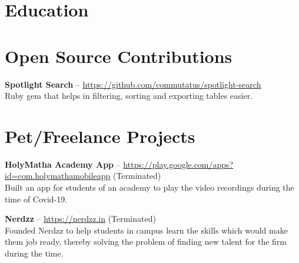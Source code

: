 \documentclass[11pt,a4paper]{moderncv}
\begin{document}


\vspace{10pt}
\section{Education}





\vspace{10pt}
\section{Open Source Contributions}

\cvlistitem
{\textbf{Spotlight Search} -- {\small \href{https://github.com/commutatus/spotlight-search}{https://github.com/commutatus/spotlight-search}}
  \\Ruby gem that helps in filtering, sorting and exporting tables easier.
}




\vspace{10pt}
\section{Pet/Freelance Projects}

\cvlistitem
{\textbf{HolyMatha Academy App} -- {\small \href{https://play.google.com/store/apps/details?id=com.holymathamobileapp}{https://play.google.com/apps?id=com.holymathamobileapp}} (Terminated)
  \\Built an app for students of an academy to play the video recordings during the time of Covid-19.
}

\vspace{5pt}

\cvlistitem
{\textbf{Nerdzz} -- {\small \href{https://nerdzz.in}{https://nerdzz.in}} (Terminated)
  \\Founded Nerdzz to help students in campus learn the skills which would make them job ready, thereby solving the problem of finding new talent for the firm during the time.
}

\vspace{5pt}
\end{document}
